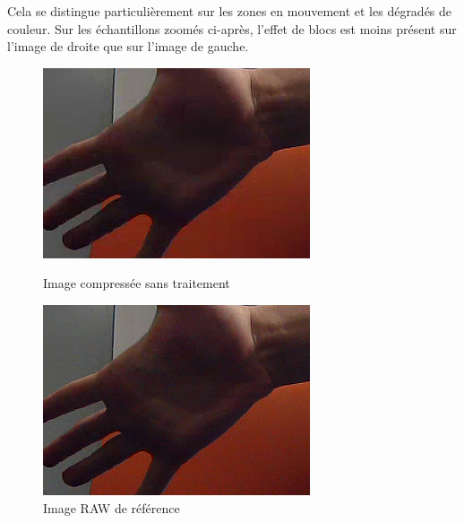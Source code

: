\documentclass[11pt,a4paper]{article}
\begin{document}
\bigbreak
Cela se distingue particulièrement sur les zones en mouvement et les dégradés de couleur.
Sur les échantillons zoomés ci-après, l'effet de blocs est moins présent sur l'image de droite que sur l'image de gauche.

\begin{figure}[H]
  \includegraphics[width=\linewidth]{images/comparaison_zoom_normal.png}
  \caption{Image compressée sans traitement}
\endminipage\hfill
{}
  \includegraphics[width=\linewidth]{images/comparaison_zoom_raw.png}
  \caption{Image RAW de référence\newline}
\endminipage\hfill
{}

\end{figure}
\end{document}
